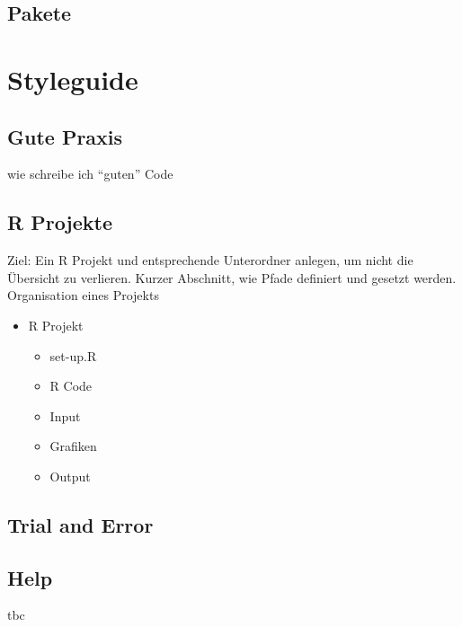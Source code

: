 \documentclass[
]{book}
\providecommand{\tightlist}{%
  \setlength{\itemsep}{0pt}\setlength{\parskip}{0pt}}
\begin{document}
\hypertarget{pakete}{%
\section{Pakete}\label{pakete}}

\hypertarget{style}{%
\chapter{Styleguide}\label{style}}

\hypertarget{gute-praxis}{%
\section{Gute Praxis}\label{gute-praxis}}

wie schreibe ich ``guten'' Code

\hypertarget{r-projekte}{%
\section{R Projekte}\label{r-projekte}}

Ziel: Ein R Projekt und entsprechende Unterordner anlegen, um nicht die Übersicht zu verlieren. Kurzer Abschnitt, wie Pfade definiert und gesetzt werden.
Organisation eines Projekts

\begin{itemize}
\tightlist
\item
  R Projekt

  \begin{itemize}
  \tightlist
  \item
    set-up.R
  \item
    R Code
  \item
    Input
  \item
    Grafiken
  \item
    Output
  \end{itemize}
\end{itemize}

\hypertarget{trial-and-error}{%
\section{Trial and Error}\label{trial-and-error}}

\hypertarget{help}{%
\section{Help}\label{help}}

tbc
\end{document}
